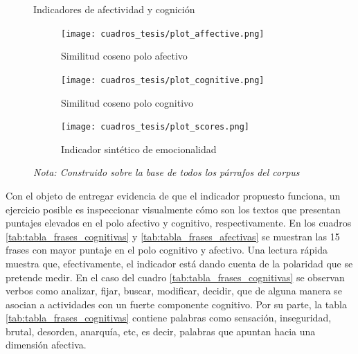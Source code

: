 \documentclass[
  12pt,
]{article}
\begin{document}
\begin{figure}[H]
     \caption{Indicadores de afectividad y cognición}
     \centering
     \begin{subfigure}[b]{0.4\textwidth}
         \centering
         \texttt{[image: cuadros\_tesis/plot\_affective.png]}
         \caption{Similitud coseno polo afectivo}
         \label{fig:similitud_afectivo}
     \end{subfigure}
     \begin{subfigure}[b]{0.4\textwidth}
         \centering
         \texttt{[image: cuadros\_tesis/plot\_cognitive.png]}
         \caption{Similitud coseno polo cognitivo}
         \label{fig:similitud_cognitiva}
     \end{subfigure}
      \begin{subfigure}[b]{0.6\textwidth}
         \centering
         \texttt{[image: cuadros\_tesis/plot\_scores.png]}
         \caption{Indicador sintético de emocionalidad}
         \label{fig:sintetico_emocionalidad}
     \end{subfigure}
     \label{fig:similitud_polos}
     \caption*{\footnotesize{\textit{Nota: Construido sobre la base de todos los párrafos del corpus} }}
\end{figure}

Con el objeto de entregar evidencia de que el indicador propuesto
funciona, un ejercicio posible es inspeccionar visualmente cómo son los
textos que presentan puntajes elevados en el polo afectivo y cognitivo,
respectivamente. En los cuadros \ref{tab:tabla_frases_cognitivas} y
\ref{tab:tabla_frases_afectivas} se muestran las 15 frases con mayor
puntaje en el polo cognitivo y afectivo. Una lectura rápida muestra que,
efectivamente, el indicador está dando cuenta de la polaridad que se
pretende medir. En el caso del cuadro \ref{tab:tabla_frases_cognitivas}
se observan verbos como analizar, fijar, buscar, modificar, decidir, que
de alguna manera se asocian a actividades con un fuerte componente
cognitivo. Por su parte, la tabla \ref{tab:tabla_frases_cognitivas}
contiene palabras como sensación, inseguridad, brutal, desorden,
anarquía, etc, es decir, palabras que apuntan hacia una dimensión
afectiva.
\end{document}
